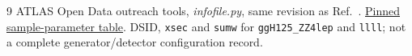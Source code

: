 \documentclass[11pt,a4paper]{article}
\begin{document}
\begin{thebibliography}{9}
ATLAS Open Data outreach tools, \emph{infofile.py}, same revision as Ref.~\cite{HZZCuts}.
\href{https://github.com/atlas-outreach-data-tools/atlas-outreach-Python-uproot-framework-13tev/blob/8ad2015be6d350060c3a183aff5802570bc9ada4/infofile.py}{Pinned sample-parameter table}.
DSID, \texttt{xsec} and \texttt{sumw} for \texttt{ggH125\_ZZ4lep} and \texttt{llll}; not a complete generator/detector configuration record.
\end{thebibliography}
\endgroup
\end{document}
